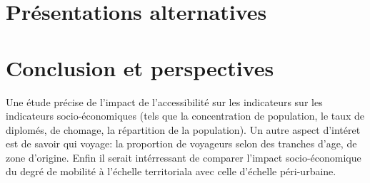 \documentclass{vgtc}                          %
\begin{document}
\section{Présentations alternatives}



\section{Conclusion et perspectives}

\vspace{0.2cm}

Une étude précise de l'impact de l'accessibilité sur les indicateurs sur les indicateurs socio-économiques (tels que la concentration de population, le taux de diplomés, de chomage, la répartition de la population).
Un autre aspect d'intéret est de savoir qui voyage: la proportion de voyageurs selon des tranches d'age, de zone d'origine.
Enfin il serait intérressant de comparer l'impact socio-économique du degré de mobilité à l'échelle territoriala avec celle d'échelle péri-urbaine. 



%

%
%
%


\end{document}
